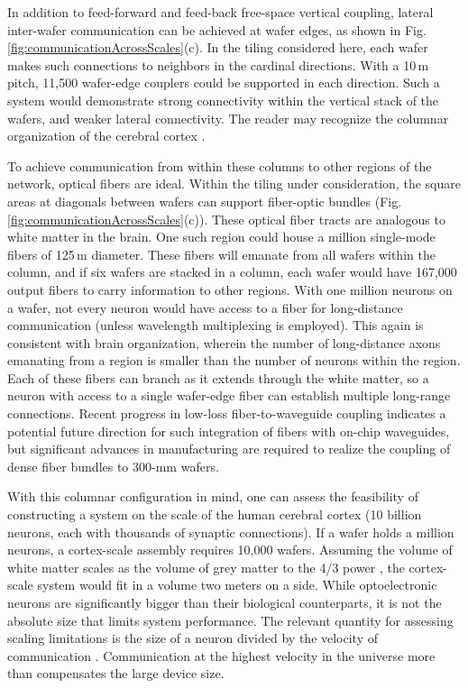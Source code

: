 \documentclass[twocolumn]{article}
\begin{document}
In addition to feed-forward and feed-back free-space vertical coupling, lateral inter-wafer communication can be achieved at wafer edges, as shown in Fig.\,\ref{fig:communicationAcrossScales}(c). In the tiling considered here, each wafer makes such connections to neighbors in the cardinal directions. With a 10\,\textmu m pitch, 11,500 wafer-edge couplers could be supported in each direction. Such a system would demonstrate strong connectivity within the vertical stack of the wafers, and weaker lateral connectivity. The reader may recognize the columnar organization of the cerebral cortex \cite{mo1997}.

To achieve communication from within these columns to other regions of the network, optical fibers are ideal. Within the tiling under consideration, the square areas at diagonals between wafers can support fiber-optic bundles (Fig.\,\ref{fig:communicationAcrossScales}(c)). These optical fiber tracts are analogous to white matter in the brain. One such region could house a million single-mode fibers of 125\,\textmu m diameter. These fibers will emanate from all wafers within the column, and if six wafers are stacked in a column, each wafer would have 167,000 output fibers to carry information to other regions. With one million neurons on a wafer, not every neuron would have access to a fiber for long-distance communication (unless wavelength multiplexing is employed). This again is consistent with brain organization, wherein the number of long-distance axons emanating from a region is smaller than the number of neurons within the region. Each of these fibers can branch as it extends through the white matter, so a neuron with access to a single wafer-edge fiber can establish multiple long-range connections. Recent progress in low-loss fiber-to-waveguide coupling \cite{khbu2020} indicates a potential future direction for such integration of fibers with on-chip waveguides, but significant advances in manufacturing are required to realize the coupling of dense fiber bundles to 300-mm wafers.

With this columnar configuration in mind, one can assess the feasibility of constructing a system on the scale of the human cerebral cortex (10 billion neurons, each with thousands of synaptic connections). If a wafer holds a million neurons, a cortex-scale assembly requires 10,000 wafers. Assuming the volume of white matter scales as the volume of grey matter to the 4/3 power \cite{zhse2000}, the cortex-scale system would fit in a volume two meters on a side. While optoelectronic neurons are significantly bigger than their biological counterparts, it is not the absolute size that limits system performance. The relevant quantity for assessing scaling limitations is the size of a neuron divided by the velocity of communication \cite{sh2019}. Communication at the highest velocity in the universe more than compensates the large device size. 
\end{document}
